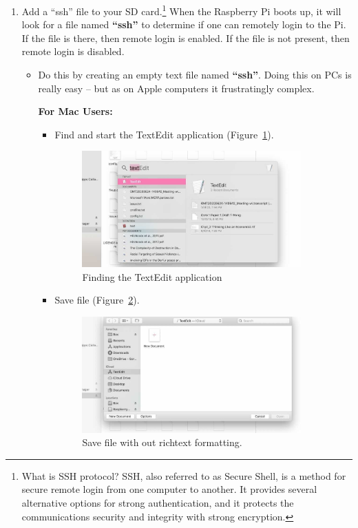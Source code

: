 \documentclass{article}
\begin{document}
\begin{enumerate}
  \item Add a ``ssh'' file to your SD card.\footnote{What is SSH protocol? SSH, also referred to as Secure Shell, is a method for secure remote login from one computer to another. It provides several alternative options for strong authentication, and it protects the communications security and integrity with strong encryption.} When the Raspberry Pi boots up, it will look for a file named \textbf{``ssh''} to determine if one can remotely login to the Pi. If the file is there, then remote login is enabled. If the file is not present, then remote login is disabled. 
  \begin{itemize}
  \item Do this by creating an empty text file named \textbf{``ssh''}. Doing this on PCs is really easy -- but as on Apple computers it frustratingly complex. 
  
\noindent\textbf{For Mac Users:} 

\begin{itemize}
  \item Find and start the TextEdit application (Figure~\ref{fig:Mac1}).
  
\begin{figure}[!h]
\centering
\includegraphics[width=0.9\textwidth]{1_MACtext_1}
\caption{Finding the TextEdit application}
\label{fig:Mac1}
\end{figure}

  \item Save file (Figure~\ref{fig:Mac2}).

\begin{figure}[h]
\centering
\includegraphics[width=0.9\textwidth]{1_MACtext_2}
\caption{Save file with out richtext formatting.}
\label{fig:Mac2}
\end{figure}


\end{itemize}
\end{itemize}
\end{enumerate}
\end{document}
